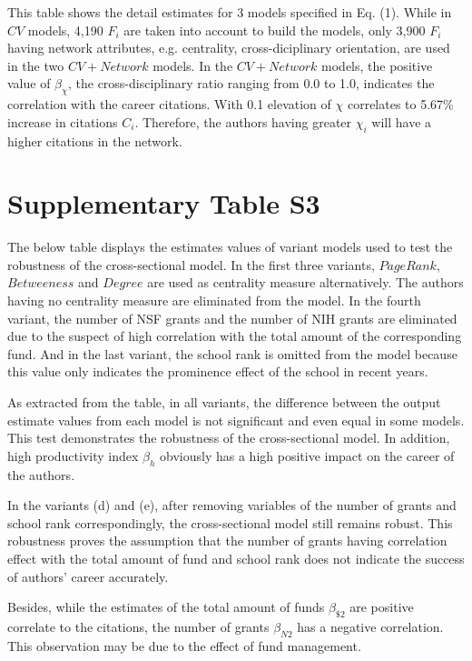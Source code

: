 \documentclass[10pt]{article}          %
\begin{document}
This table shows the detail estimates for 3 models specified in Eq. (1). While in $CV$ models, 4,190 $F_i$ are taken into account to build the models, only 3,900 $F_i$ having network attributes, e.g. centrality, cross-diciplinary orientation, are used in the two $CV + Network$ models. In the $CV + Network$ models, the positive value of $\beta_{\chi}$, the cross-disciplinary ratio ranging from 0.0 to 1.0, indicates the correlation with the career citations. With 0.1 elevation of $\chi$ correlates to 5.67\% increase in citations $C_i$. Therefore, the authors having greater $\chi_i$ will have a higher citations in the network.


\newpage
\section{Supplementary Table S3}
\par
The below table displays the estimates values of variant models used to test the robustness of the cross-sectional model. In the first three variants, $Page Rank$, $Betweeness$ and $Degree$ are used as centrality measure alternatively. The authors having no centrality measure are eliminated from the model. In the fourth variant, the number of NSF grants and the number of NIH grants are eliminated due to the suspect of high correlation with the total amount of the corresponding fund. And in the last variant, the school rank is omitted from the model because this value only indicates the prominence effect of the school in recent years.

As extracted from the table, in all variants, the difference between the output estimate values from each model is not significant and even equal in some models. This test demonstrates the robustness of the cross-sectional model. In addition, high productivity index $\beta_h$ obviously has a high positive impact on the career of the authors.

In the variants (d) and (e), after removing variables of the number of grants and school rank correspondingly, the cross-sectional model still remains robust. This robustness proves the assumption that the number of grants having correlation effect with the total amount of fund and school rank does not indicate the success of authors' career accurately. 

Besides, while the estimates of the total amount of funds $\beta_{\$2}$ are positive correlate to the citations, the number of grants $\beta_{N2}$ has a negative correlation. This observation may be due to the effect of fund management.
\end{document}
